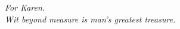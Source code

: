\chapter*{~}

\begin{center}
\textit{For Karen.\\
Wit beyond measure is man's greatest treasure.\\[36pt]}
\end{center}